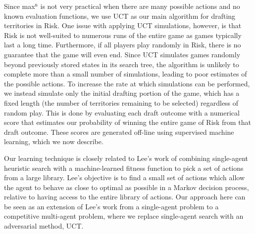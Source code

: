 \documentclass[letterpaper]{article}
\numberwithin{equation}{section}
\numberwithin{theorem}{section}
\numberwithin{lemma}{section}
\numberwithin{df}{section}
\begin{document}
Since max$^\text{n}$ is not very practical when there are many possible actions and no known evaluation functions, we use UCT as our main algorithm for drafting territories in Risk.  One issue with applying UCT simulations, however, is that Risk is not well-suited to numerous runs of the entire game as games typically last a long time.  Furthermore, if all players play randomly in Risk, there is no guarantee that the game will even end.  Since UCT simulates games randomly beyond previously stored states in its search tree, the algorithm is unlikely to complete more than a small number of simulations, leading to poor estimates of the possible actions.  To increase the rate at which simulations can be performed, we instead simulate only the initial drafting portion of the game, which has a fixed length (the number of territories remaining to be selected) regardless of random play.  This is done by evaluating each draft outcome with a numerical score that estimates our probability of winning the entire game of Risk from that draft outcome.  These scores are generated off-line using supervised machine learning, which we now describe.
%

Our learning technique is closely related to Lee's work \cite{GregLeeThesis} of combining single-agent heuristic search with a machine-learned fitness function to pick a set of actions from a large library.  Lee's objective is to find a small set of actions which allow the agent to behave as close to optimal as possible in a Markov decision process, relative to having access to the entire library of actions.  Our approach here can be seen as an extension of Lee's work from a single-agent problem to a competitive multi-agent problem, where we replace single-agent search with an adversarial method, UCT. 
\end{document}

